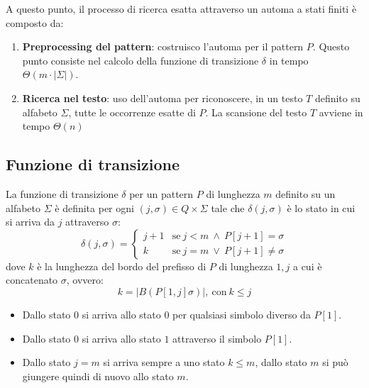 A questo punto, il processo di ricerca esatta attraverso un automa a stati finiti
è composto da:
\begin{enumerate}
    \item \textbf{Preprocessing del pattern}: costruisco l'automa per il pattern
          $P$. Questo punto consiste nel calcolo della funzione di transizione
          $\delta$ in tempo $\Theta(m \cdot |\Sigma|)$.
    \item \textbf{Ricerca nel testo}: uso dell'automa per riconoscere, in un testo
          $T$ definito su alfabeto $\Sigma$, tutte le occorrenze esatte di $P$.
          La scansione del testo $T$ avviene in tempo $\Theta(n)$
\end{enumerate}
\subsection{Funzione di transizione}
La funzione di transizione $\delta$ per un pattern $P$ di lunghezza $m$ definito
su un alfabeto $\Sigma$ è definita per ogni $(j, \sigma) \in Q \times \Sigma$ tale
che $\delta(j, \sigma)$ è lo stato in cui si arriva da $j$ attraverso $\sigma$:
\begin{equation}
    \delta(j, \sigma) = \begin{cases}
        j + 1 & \text{se} \ j < m \ \land \ P[j + 1] = \sigma   \\
        k     & \text{se} \ j = m \ \lor \ P[j + 1] \neq \sigma
    \end{cases}
\end{equation}
dove $k$ è la lunghezza del bordo del prefisso di $P$ di lunghezza $1, j$ a cui
è concatenato $\sigma$, ovvero:
\begin{equation}
    k = |B(P[1, j]\sigma)|, \ \text{con} \ k \leq j
\end{equation}
\begin{itemize}
    \item Dallo stato $0$ si arriva allo stato $0$ per qualsiasi simbolo diverso
          da $P[1]$.
    \item Dallo stato $0$ si arriva allo stato $1$ attraverso il simbolo $P[1]$.
    \item  Dallo stato $j = m$ si arriva sempre a uno stato $k \leq m$, dallo
          stato $m$ si può giungere quindi di nuovo allo stato $m$.
\end{itemize}
